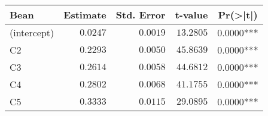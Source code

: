 \begin{table}[!tbp]
\begin{center}
\begin{tabular}{lrrrr}
\hline\hline
\multicolumn{1}{l}{Bean}&\multicolumn{1}{c}{Estimate}&\multicolumn{1}{c}{Std. Error}&\multicolumn{1}{c}{t-value}&\multicolumn{1}{c}{Pr(\textgreater |t|)}\tabularnewline
\hline
(intercept)&$0.0247$&$0.0019$&$13.2805$&$0.0000$***\tabularnewline
C2&$0.2293$&$0.0050$&$45.8639$&$0.0000$***\tabularnewline
C3&$0.2614$&$0.0058$&$44.6812$&$0.0000$***\tabularnewline
C4&$0.2802$&$0.0068$&$41.1755$&$0.0000$***\tabularnewline
C5&$0.3333$&$0.0115$&$29.0895$&$0.0000$***\tabularnewline
\hline
\end{tabular}\end{center}

\end{table}
